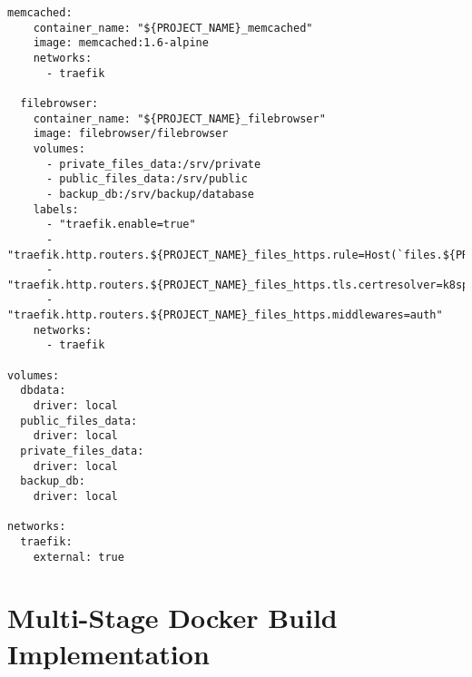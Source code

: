 \begin{lstlisting}[caption={Backend Production Configuration}, captionpos=b, breaklines=true]
  memcached:
    container_name: "${PROJECT_NAME}_memcached"
    image: memcached:1.6-alpine
    networks:
      - traefik

  filebrowser:
    container_name: "${PROJECT_NAME}_filebrowser"
    image: filebrowser/filebrowser
    volumes:
      - private_files_data:/srv/private
      - public_files_data:/srv/public
      - backup_db:/srv/backup/database
    labels:
      - "traefik.enable=true"
      - "traefik.http.routers.${PROJECT_NAME}_files_https.rule=Host(`files.${PROJECT_BASE_DOMAIN}`)"
      - "traefik.http.routers.${PROJECT_NAME}_files_https.tls.certresolver=k8spreprodchallenge"
      - "traefik.http.routers.${PROJECT_NAME}_files_https.middlewares=auth"
    networks:
      - traefik

volumes:
  dbdata:
    driver: local
  public_files_data:
    driver: local
  private_files_data:
    driver: local
  backup_db:
    driver: local

networks:
  traefik:
    external: true
\end{lstlisting}

\section{Multi-Stage Docker Build Implementation}
\label{appendix:multistage_docker}


